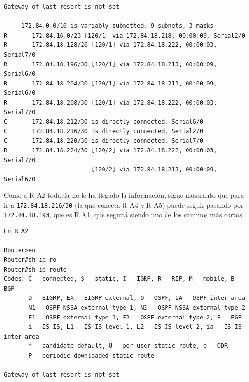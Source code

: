 \documentclass[11pt]{article}
\begin{document}
\begin{enumerate}
\begin{mdframed}
\begin{verbatim}
Gateway of last resort is not set

     172.84.0.0/16 is variably subnetted, 9 subnets, 3 masks
R       172.84.16.0/23 [120/1] via 172.84.18.218, 00:00:09, Serial2/0
R       172.84.18.128/26 [120/1] via 172.84.18.222, 00:00:03, Serial7/0
R       172.84.18.196/30 [120/1] via 172.84.18.213, 00:00:09, Serial6/0
R       172.84.18.204/30 [120/1] via 172.84.18.213, 00:00:09, Serial6/0
R       172.84.18.208/30 [120/1] via 172.84.18.222, 00:00:03, Serial7/0
C       172.84.18.212/30 is directly connected, Serial6/0
C       172.84.18.216/30 is directly connected, Serial2/0
C       172.84.18.220/30 is directly connected, Serial7/0
R       172.84.18.224/30 [120/2] via 172.84.18.222, 00:00:03, Serial7/0
                         [120/2] via 172.84.18.213, 00:00:09, Serial6/0
\end{verbatim}
\end{mdframed}

Como a R A2 todavía no le ha llegado la información, sigue mostranto que para ir a \texttt{172.84.18.216/30} (la que conecta R A4 y R A5) puede seguir pasando por \texttt{172.84.18.193}, que es R A1, que seguirá siendo uno de los caminos más cortos.

\begin{mdframed}
\begin{verbatim}
En R A2

Router>en
Router#sh ip ro
Router#sh ip route 
Codes: C - connected, S - static, I - IGRP, R - RIP, M - mobile, B - BGP
       D - EIGRP, EX - EIGRP external, O - OSPF, IA - OSPF inter area
       N1 - OSPF NSSA external type 1, N2 - OSPF NSSA external type 2
       E1 - OSPF external type 1, E2 - OSPF external type 2, E - EGP
       i - IS-IS, L1 - IS-IS level-1, L2 - IS-IS level-2, ia - IS-IS inter area
       * - candidate default, U - per-user static route, o - ODR
       P - periodic downloaded static route

Gateway of last resort is not set


\end{verbatim}
\end{mdframed}
\end{enumerate}
\end{document}
